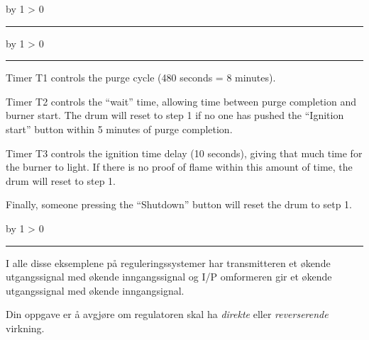 \documentclass[12pt,a4paper]{article}
\def\oppgave{
            \advance\questnum by 1
            \ifnum \questnum > 0
                 \hrule
                 \vskip 3pt
                 \leftline{Oppgave \the\questnum}
                 \vskip 3pt \fi}
\def\svar{
           \advance\answnum by 1
           \ifnum \answnum > 0
                \hrule
                \vskip 3pt
                \leftline{Svar \the\answnum}
                \vskip 3pt \fi}
\def\notes{
           \advance\explnum by 1
           \ifnum \explnum > 0
                \hrule
                \vskip 3pt
                \leftline{Notes \the\explnum}
                \vskip 3pt \fi}
\begin{document}
\vskip 10pt \filbreak 





\svar{} 


\vskip 10pt \filbreak 





\notes{} 

Timer T1 controls the purge cycle (480 seconds = 8 minutes).

\vskip 10pt

Timer T2 controls the ``wait'' time, allowing time between purge completion and burner start.  The drum will reset to step 1 if no one has pushed the ``Ignition start'' button within 5 minutes of purge completion.

\vskip 10pt

Timer T3 controls the ignition time delay (10 seconds), giving that much time for the burner to light.  If there is no proof of flame within this amount of time, the drum will reset to step 1.

\vskip 10pt

Finally, someone pressing the ``Shutdown'' button will reset the drum to setp 1.


\vfil \eject 



\oppgave{} 

I alle disse eksemplene på reguleringssystemer har transmitteren et økende utgangssignal med økende inngangssignal og I/P omformeren gir et økende utgangssignal med økende inngangsignal.


Din oppgave er å avgjøre om regulatoren skal ha \textit{direkte} eller \textit{reverserende} virkning. 

\end{document}

